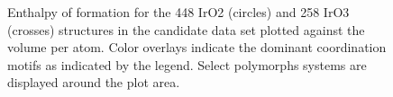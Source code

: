 \begin{figure}[!htb]
\centering
{}
\caption{\label{fig:iro2_al}
Enthalpy of formation for the 448 IrO2 (circles) and 258 IrO3 (crosses) structures in the candidate data set plotted against the volume per atom.
%
Color overlays indicate the dominant coordination motifs as indicated by the legend.
%
Select polymorphs systems are displayed around the plot area.
}
\end{figure}








